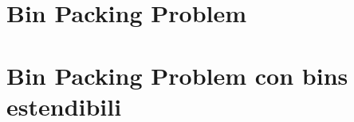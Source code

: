 \documentclass[a4paper]{report}
\begin{document}
\tableofcontents

\chapter{Bin Packing Problem}


\chapter{Bin Packing Problem con bins estendibili}


\printbibliography
\end{document}
